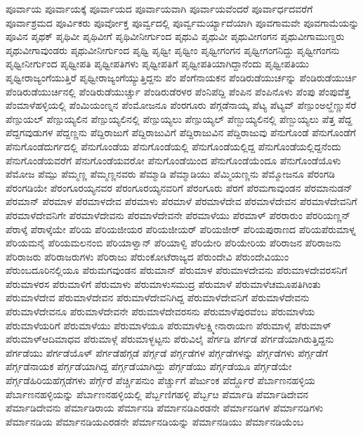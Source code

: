{ಪೂರ್ವಾಯ
ಪೂರ್ವಾಯಕ್ಕೆ
ಪೂರ್ವಾಯದ
ಪೂರ್ವಾಯವಾಗಿ
ಪೂರ್ವಾಯವೆಂದರೆ
ಪೂರ್ವಾರ್ಧದವರೆಗೆ
ಪೂರ್ವಾಶ್ರಮದ
ಪೂರ್ವಿಕರು
ಪೂರ್ವೋಕ್ತ
ಪೂರ್ವ್ವದಲ್ಲಿ
ಪೂರ್ವ್ವಮರ್ಯ್ಯಾದೆಯಾಗಿ
ಪೂವಗಾಮವೇ
ಪೂವಗಾಮೆಯನ್ನು
ಪೂವಿನ
ಪೃಥಕ್
ಪೃಥಿವೀ
ಪೃಥಿವೀಗೆ
ಪೃಥಿವೀನೀರ್ಗುಂದ
ಪೃಥುವಿ
ಪೃಥುವೀ
ಪೃಥುವೀಗಂಗನ
ಪೃಥುವೀಗಾಮುಣ್ಡರು
ಪೃಥುವೀಗಾವುಂಡರು
ಪೃಥುವೀನೀರ್ಗುಂದ
ಪೃಥ್ವಿ
ಪೃಥ್ವೀ
ಪೃಥ್ವೀಂ
ಪೃಥ್ವೀಗಂಗನ
ಪೃಥ್ವೀಗಂಗನಿದ್ದು
ಪೃಥ್ವೀಗಂಗನು
ಪೃಥ್ವೀನೀರ್ಗುಂದ
ಪೃಥ್ವೀಪತಿ
ಪೃಥ್ವೀಪತಿಗಳು
ಪೃಥ್ವೀಪತಿಗೆ
ಪೃಥ್ವೀಪತಿಯಾಗಿದ್ದಾನೆಂದು
ಪೃಥ್ವೀಪತಿಯು
ಪೃಥ್ವೀರಾಜ್ಯಂಗೆಯುತ್ತಿರೆ
ಪೃಥ್ವೀರಾಜ್ಯಂಗೆಯ್ಯುತ್ತಿದ್ದನು
ಪೆಂ
ಪೆಂಗೆನಾಯಕನ
ಪೆಂಡಿರುಡೆಯುರ್ಚನ್ನು
ಪೆಂಡಿರುಡೆಯುರ್ಚಿ
ಪೆಂಡಿರುಡೆಯುರ್ಚಿನಲ್ಲಿ
ಪೆಂಡಿರುಡೆಯುರ್ಚ್ಚು
ಪೆಂಡಿರುಡೆರಳರ
ಪೆಂನಿಪೆದ್ದಿ
ಪೆಂಪಿನ
ಪೆಂಪಿನೊಳು
ಪೆಂಪು
ಪೆಂಪುವೆತ್ತ
ಪೆಂಮಾಳೆಹಳ್ಳಿಯಲ್ಲಿ
ಪೆಂಮಿಯಂಣ್ನನ
ಪೆಂಮೋಜನೂ
ಪೆಂರಗೂರು
ಪೆಗ್ಗಡೆನಾಯ್ಕ
ಪೆಟ್ಯ
ಪೆಟ್ಯವ್
ಪೆಣ್ಪುಂಅಲ್ಹೆಣ್ಣುಸೆರೆ
ಪೆಣ್ಪುಯಲ್
ಪೆಣ್ಪುಯ್ಯಲಿನ
ಪೆಣ್ಪುಯ್ಯಲಿನಲ್ಲಿ
ಪೆಣ್ಪುಯ್ಯಲು
ಪೆಣ್ಪುಯ್ಯಲ್
ಪೆಣ್ಬುಯ್ಯಲಿನಲ್ಲಿ
ಪೆಣ್ಬುಯ್ಯಲು
ಪೆತ್ತ
ಪೆದ್ದ
ಪೆದ್ದಗವುಡುಗಳ
ಪೆದ್ದಣ್ಣನು
ಪೆದ್ದಿರಾಜುಗೆ
ಪೆದ್ದಿರಾಜುವಿಗೆ
ಪೆದ್ದಿರಾಜುವಿನ
ಪೆದ್ದಿರಾಜುವು
ಪೆನುಗೊಂಡೆ
ಪೆನುಗೊಂಡೆಗೆ
ಪೆನುಗೊಂಡೆದುರ್ಗದಲ್ಲಿ
ಪೆನುಗೊಂಡೆಯ
ಪೆನುಗೊಂಡೆಯಲ್ಲಿ
ಪೆನುಗೊಂಡೆಯಲ್ಲಿದ್ದ
ಪೆನುಗೊಂಡೆಯಲ್ಲಿದ್ದನೆಂದು
ಪೆನುಗೊಂಡೆಯವರೆಗೆ
ಪೆನುಗೊಂಡೆಯವರೋ
ಪೆನುಗೊಂಡೆಯಿಂದ
ಪೆನುಗೊಂಡೆಯೆಂದೂ
ಪೆನುಗೊಂಡೆಯೊಳು
ಪೆಮೋಜ
ಪೆಮ್ಪು
ಪೆಮ್ಮಣ್ಣ
ಪೆಮ್ಮಣ್ಣನವರು
ಪೆಮ್ಮಾಡಿ
ಪೆಮ್ಮಾಡಿಯು
ಪೆಮ್ಮಿಯಣ್ಣನು
ಪೆಮ್ಮೋಜನೂ
ಪೆರಂಗಡಿ
ಪೆರಂಗಡಿಯೇ
ಪೆರಂಗೂರಯ್ಯನವರ
ಪೆರಂಗೂರಯ್ಯನವರಿಗೆ
ಪೆರಂಗೂರು
ಪೆರಗೆ
ಪೆರಮಗಾವುಂಡನ
ಪೆರಮಾನುಡನ್
ಪೆರಮಾನ್
ಪೆರಮಾಳ
ಪೆರಮಾಳದೇವ
ಪೆರಮಾಳು
ಪೆರಮಾಳೆ
ಪೆರಮಾಳೆದೇವ
ಪೆರಮಾಳೆದೇವನ
ಪೆರಮಾಳೆದೇವನಿಗೆ
ಪೆರಮಾಳೆದೇವನಿಗೇ
ಪೆರಮಾಳೆದೇವನು
ಪೆರಮಾಳೆದೇವನೇ
ಪೆರಮಾಳೆಯು
ಪೆರಮಾಳ್
ಪೆರರಾರುಂ
ಪೆರರಿಯಣ್ಣನ್
ಪೆರಾಳ್ಕೆ
ಪೆರಾಳ್ಕೆಯೇ
ಪೆರಿಯ
ಪೆರಿಯಜೀಯರ
ಪೆರಿಯಜೀಯರ್
ಪೆರಿಯಜೀರ್
ಪೆರಿಯಪುರಾಣದ
ಪೆರಿಯಪೆರುಮಾಳ್ನ
ಪೆರಿಯಮನೈ
ಪೆರಿಯಮಲನಂಬಿ
ಪೆರಿಯಾಳ್ವಾನ್
ಪೆರಿಯಾಳ್ವಿ
ಪೆರಿಯೇರಿ
ಪೆರಿಯೇರಿಯ
ಪೆರಿರಾಜನ
ಪೆರಿರಾಜನು
ಪೆರಿರಾಜರು
ಪೆರಿರಾಜರುಗಳು
ಪೆರಿರಾಜು
ಪೆರುಂಕೋಟೆರಾಜ್ಯದ
ಪೆರುಂದೇವಿ
ಪೆರುಂದೇವಿಯುಂ
ಪೆರುಂಬದೂರಿನಲ್ಲಿಯೂ
ಪೆರುಮಗವುಂಡನ
ಪೆರುಮಾನ್
ಪೆರುಮಾಳ
ಪೆರುಮಾಳದೇವನು
ಪೆರುಮಾಳದೇವರಸನಿಗೆ
ಪೆರುಮಾಳರಸ
ಪೆರುಮಾಳಿಗೆ
ಪೆರುಮಾಳು
ಪೆರುಮಾಳುಸಮುದ್ರ
ಪೆರುಮಾಳೆ
ಪೆರುಮಾಳೆಚಮೂಪತಿಗಿಂತು
ಪೆರುಮಾಳೆದೇವ
ಪೆರುಮಾಳೆದೇವನ
ಪೆರುಮಾಳೆದೇವನಿಗಿದ್ದ
ಪೆರುಮಾಳೆದೇವನಿಗೆ
ಪೆರುಮಾಳೆದೇವನು
ಪೆರುಮಾಳೆದೇವನೂ
ಪೆರುಮಾಳೆದೇವನೇ
ಪೆರುಮಾಳೆದೇವರಸನು
ಪೆರುಮಾಳೆಪುರವೆಂಬ
ಪೆರುಮಾಳೆಯ
ಪೆರುಮಾಳೆಯರಿಗೆ
ಪೆರುಮಾಳೆಯು
ಪೆರುಮಾಳೆಯೂ
ಪೆರುಮಾಳೆಲಕ್ಷ್ಮೀನಾರಾಯಣ
ಪೆರುಮಾಳೈ
ಪೆರುಮಾಳ್
ಪೆರುಮಾಳ್ಆದಿಮಾಧವ
ಪೆರುಮಾಳ್ಗೆ
ಪೆರುಮಾಳ್ಭಟ್ಟನು
ಪೆರುವಿಲೈ
ಪೆರ್ಗಡಿ
ಪೆರ್ಗಡೆ
ಪೆರ್ಗಡೆಯಾಗಿರುತ್ತಿದ್ದನು
ಪೆರ್ಗಡೆಯು
ಪೆರ್ಗಡೆಯೊಳ್
ಪೆರ್ಗಡೆಹೆಗ್ಗಡೆ
ಪೆರ್ಗ್ಗಡೆ
ಪೆರ್ಗ್ಗಡೆಗಳ
ಪೆರ್ಗ್ಗಡೆಗಳನ್ನು
ಪೆರ್ಗ್ಗಡೆಗಳು
ಪೆರ್ಗ್ಗಡೆಗೆ
ಪೆರ್ಗ್ಗಡೆನಾಯಕ
ಪೆರ್ಗ್ಗಡೆಯಾಗಿದ್ದ
ಪೆರ್ಗ್ಗಡೆಯಾಗಿದ್ದು
ಪೆರ್ಗ್ಗಡೆಯು
ಪೆರ್ಗ್ಗಡೆಯೂ
ಪೆರ್ಗ್ಗಡೆಯೇ
ಪೆರ್ಗ್ಗಡೆಹಿರಿಯಹೆಗ್ಗಡೆಗಳು
ಪೆರ್ಗ್ಗೆರೆ
ಪೆರ್ಚ್ಚಿಪನುಂ
ಪೆರ್ಚ್ಚುಗೆ
ಪೆರ್ಜುಂಕ
ಪೆರ್ದ್ದೊರೆ
ಪೆರ್ಬಾಣನಹಳ್ಳಿಯ
ಪೆರ್ಬಾಣನಹಳ್ಳಿಯನ್ನು
ಪೆರ್ಬಾಣನಹಳ್ಳಿಯಲ್ಲಿ
ಪೆರ್ಬ್ಬಣಿಗಹಳ್ಳಿ
ಪೆರ್ಬ್ಬೞ
ಪೆರ್ಮಾಡಿ
ಪೆರ್ಮಾಡಿದೇವನ
ಪೆರ್ಮಾಡಿದೇವನು
ಪೆರ್ಮಾಡಿರಾಯ
ಪೆರ್ಮಾನಡಿ
ಪೆರ್ಮಾನಡಿಎರಡನೇ
ಪೆರ್ಮಾನಡಿಗಳ
ಪೆರ್ಮಾನಡಿಗಳು
ಪೆರ್ಮಾನಡಿಯ
ಪೆರ್ಮಾನಡಿಯಎರಡನೇ
ಪೆರ್ಮಾನಡಿಯನ್ನು
ಪೆರ್ಮಾನಡಿಯು
ಪೆರ್ಮಾನಡಿಯೆಂಬ
}
